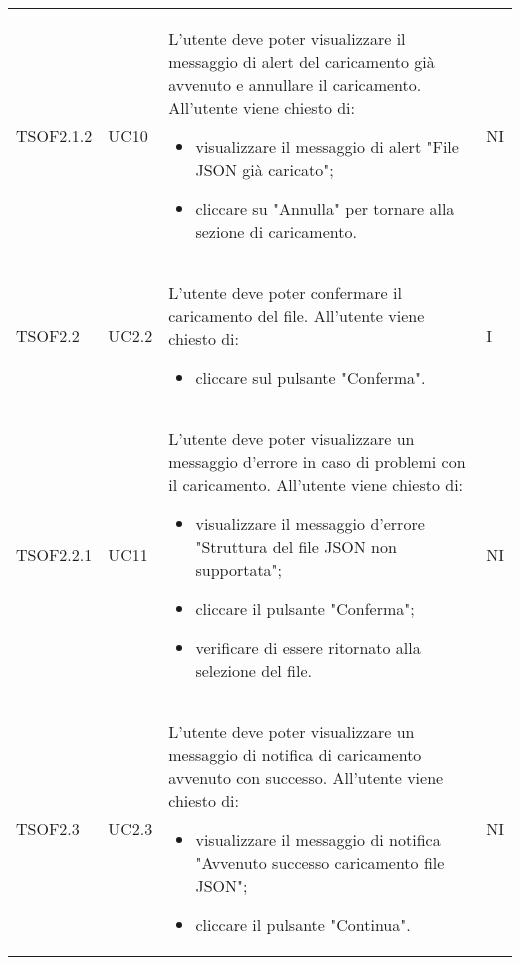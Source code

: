\begin{longtable}{C{2.5cm} C{2.5cm} L{8cm} C{2cm}}
TSOF2.1.2 & UC10 &
L'utente deve poter visualizzare il messaggio di alert del caricamento già avvenuto e annullare il caricamento. \newline All'utente viene chiesto di:
\begin{itemize}
	\item visualizzare il messaggio di alert "File JSON già caricato";
	\item cliccare su "Annulla" per tornare alla sezione di caricamento.
\end{itemize} & NI	\\

TSOF2.2 & UC2.2 &
L'utente deve poter confermare il caricamento del file. \newline All'utente viene chiesto di:
\begin{itemize}
	\item cliccare sul pulsante "Conferma".
\end{itemize} & I	\\


TSOF2.2.1 & UC11 &
L'utente deve poter visualizzare un messaggio d'errore in caso di problemi con il caricamento. \newline All'utente viene chiesto di:
\begin{itemize}
	\item visualizzare il messaggio d'errore "Struttura del file JSON non supportata";
	\item cliccare il pulsante "Conferma";
	\item verificare di essere ritornato alla selezione del file.
\end{itemize} & NI	\\

TSOF2.3 & UC2.3 &
L'utente deve poter visualizzare un messaggio di notifica di caricamento avvenuto con successo. \newline All'utente viene chiesto di:
\begin{itemize}
	\item visualizzare il messaggio di notifica "Avvenuto successo caricamento file JSON";
	\item cliccare il pulsante "Continua".
\end{itemize} & NI	\\


\end{longtable}
